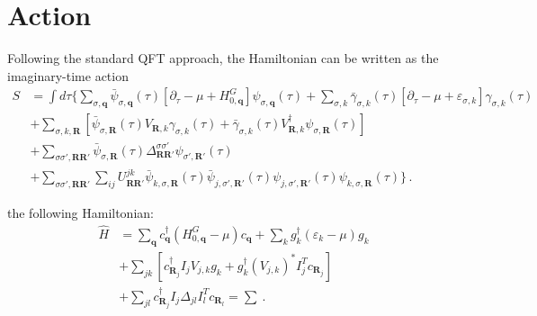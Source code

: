 \documentclass[aps, prb, superscriptaddress, preprint, floatfix]{revtex4-1}
\begin{document}
\section{Action}

Following the standard QFT approach, the Hamiltonian can be written as the imaginary-time action
%
\begin{align}
	S &= \int d\tau
	\Bigg\{
	\sum_{\sigma,\mathbf{q}}
	\bar\psi_{\sigma,\mathbf{q}}(\tau)
	\left[\partial_\tau -\mu + H_{0,\mathbf{q}}^G \right]
	\psi_{\sigma,\mathbf{q}}(\tau)
	+
	\sum_{\sigma, k} \bar\gamma_{\sigma, k}(\tau) \left[\partial_\tau - \mu + \varepsilon_{\sigma,k}  \right]\gamma_{ \sigma,k}(\tau) 
	\nonumber
	\\
	&+ 
	\sum_{\sigma,k,\mathbf{R}}\left[ \bar\psi_{\sigma,\mathbf{R}} (\tau)V_{\mathbf{R},k}\gamma_{\sigma,k}(\tau) + \bar\gamma_{\sigma,k}(\tau) V_{\mathbf{R},k}^\dagger \psi_{\sigma,\mathbf{R}}(\tau)\right]
	\nonumber
	\\
	&+
	\sum_{\sigma\sigma',\mathbf{RR}'} \bar\psi_{\sigma,\mathbf{R}}(\tau)\Delta_{\mathbf{RR}'}^{\sigma\sigma'}\psi_{\sigma',\mathbf{R}'}(\tau)
	\nonumber
	\\
	&+
	\sum_{\sigma\sigma',\mathbf{RR}'}\sum_{ij}
	U_{\mathbf{RR}'}^{jk}
	\bar\psi_{k,\sigma,\mathbf{R}}(\tau)
	\bar\psi_{j,\sigma',\mathbf{R}'}(\tau)
	\psi_{j,\sigma',\mathbf{R}'}(\tau)
	\psi_{k,\sigma,\mathbf{R}}(\tau)
	\Bigg\}\,.
\end{align}
% 



the following Hamiltonian:
%
\begin{align}
    \hat{H} &= \sum_{\mathbf{q}} c^\dagger_{\mathbf{q}}
    \left(H_{0,\mathbf{q}}^G - \mu\right)
    c_{\mathbf{q}}
    +
    \sum_{ k} g_{ k}^\dagger \left(\varepsilon_k - \mu\right)  g_{ k}
    \nonumber
    \\
    &+
    \sum_{ jk} 
    \left[
    c^\dagger_{\mathbf{R}_j}I_j V_{j,k} g_{ k} 
    + 
    g_{ k}^\dagger \left(V_{j,k}\right)^* I_j^T c_{\mathbf{R}_j}
    \right]
    \nonumber
    \\
    &+  
    \sum_{jl} c_{\mathbf{R}_j}^\dagger I_j \Delta_{jl} I^T_lc_{\mathbf{R}_l}
    =
    \sum_{}
    \,.
    \label{eqn:H0_QFT}
\end{align}
%
\end{document}
